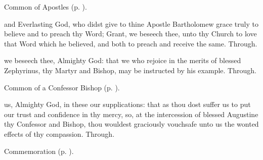 \begin{rubric}
	Common of Apostles (p. \pageref{CommonApostles}).
\end{rubric}





\collect
{} and Everlasting God, who didst give to thine Apostle Bartholomew grace truly to believe and to preach thy Word; Grant, we beseech thee, unto thy Church to love that Word which he believed, and both to preach and receive the same. Through.



\memorialCollect
{} we beseech thee, Almighty God: that we who rejoice in the merits of blessed Zephyrinus, thy Martyr and Bishop, may be instructed by his example. Through.


\clearpage
{}

\begin{rubric}
	Common of a Confessor Bishop (p. \pageref{CommonConfessorBishop}).
\end{rubric}

\collect
{} us, Almighty God, in these our supplications: that as thou dost suffer us to put our trust and confidence in thy mercy, so, at the intercession of blessed Augustine thy Confessor and Bishop, thou wouldest graciously vouchsafe unto us the wonted effects of thy compassion. Through.

\begin{rubric}
    Commemoration  (p. \pageref{HermesCollect}).
\end{rubric}



